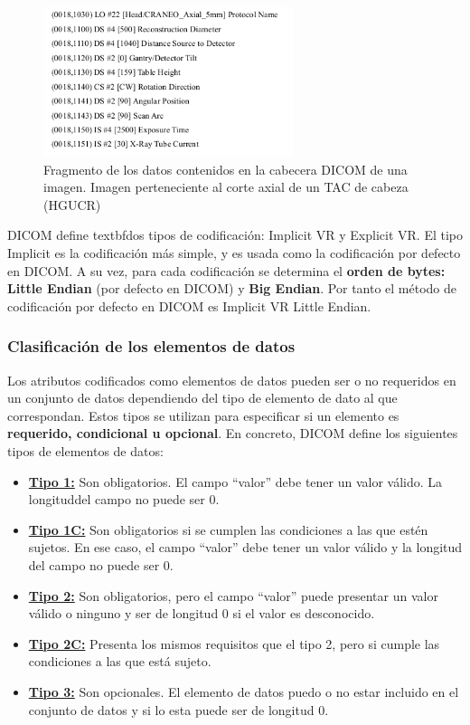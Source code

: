 \begin{figure}[!h]
\begin{center}
\includegraphics[width=0.65\textwidth]{images/fragDatos.png}
\caption{Fragmento de los datos contenidos en la cabecera \acs{DICOM} de una imagen. Imagen perteneciente al corte axial de un TAC de cabeza (HGUCR)}
\label{fig:fragDatos}
\end{center}
\end{figure}

DICOM define textbf{dos tipos de codificación: Implicit VR y Explicit VR}. El tipo Implicit es la codificación más simple, y es usada como la codificación por defecto en DICOM. A su vez, para cada codificación se determina el \textbf{orden de bytes: Little Endian} (por defecto en DICOM) y \textbf{Big Endian}. Por tanto el método de codificación por defecto en DICOM es Implicit VR Little Endian.

\subsubsection{Clasificación de los elementos de datos}
Los atributos codificados como elementos de datos pueden ser o no requeridos en un conjunto de datos dependiendo del tipo de elemento de dato al que correspondan. Estos tipos se utilizan para especificar si un elemento es \textbf{requerido, condicional u opcional}. En concreto, DICOM define los siguientes tipos de elementos de datos: 

\begin{itemize}
\item \textbf{\underline{Tipo 1:}} Son obligatorios. El campo “valor” debe tener un valor válido. La longituddel campo no puede ser 0.
\item \textbf{\underline{Tipo 1C:}} Son obligatorios si se cumplen las condiciones a las que estén sujetos. En ese caso, el campo “valor” debe tener un valor válido y la longitud del campo no puede ser 0.
\item \textbf{\underline{Tipo 2:}} Son obligatorios, pero el campo “valor” puede presentar un valor válido o ninguno y ser de longitud 0 si el valor es desconocido.
\item \textbf{\underline{Tipo 2C:}} Presenta los mismos requisitos que el tipo 2, pero si cumple las condiciones a las que está sujeto.
\item \textbf{\underline{Tipo 3:}} Son opcionales. El elemento de datos puedo o no estar incluido en el conjunto de datos y si lo esta puede ser de longitud 0.
\end{itemize}

